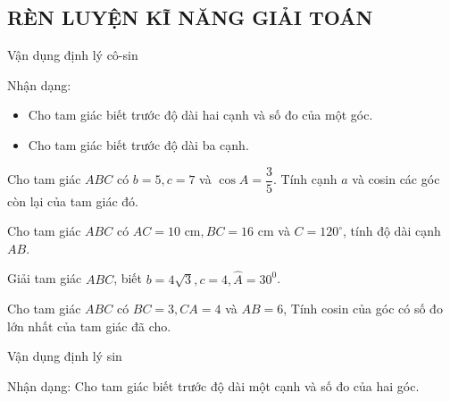 \subsection{RÈN LUYỆN KĨ NĂNG GIẢI TOÁN}

\begin{dang}{Vận dụng định lý cô-sin}
	\begin{note}
		Nhận dạng:
		\begin{itemize}
			\item [$\bullet$] Cho tam giác biết trước độ dài hai cạnh và số đo của một góc.
			\item [$\bullet$] Cho tam giác biết trước độ dài ba cạnh.
		\end{itemize}
	\end{note}
\end{dang}

\begin{vd}
	Cho tam giác $ABC$ có $b=5, c=7$ và $\cos A=\dfrac{3}{5}$. Tính cạnh $a$ và cosin các góc còn lại của tam giác đó.
\end{vd}

\begin{vd}
	Cho tam giác $ABC$ có $AC = 10 \textrm{ cm}, BC = 16 \textrm{ cm}$ và $C=120^\circ$, tính độ dài cạnh $AB$.
\end{vd}

\begin{vd}
	Giải tam giác $ABC$, biết $b=4\sqrt{3},c=4,\widehat{A}=30^{0}$.
\end{vd}

\begin{vd}
	Cho tam giác $ABC$ có $BC=3, CA=4$ và $AB=6$, Tính cosin của góc có số đo lớn nhất của tam giác đã cho.
\end{vd}

\begin{dang}{Vận dụng định lý sin}
	\begin{note}
		Nhận dạng: Cho tam giác biết trước độ dài một cạnh và số đo của hai góc.
	\end{note}
\end{dang}

